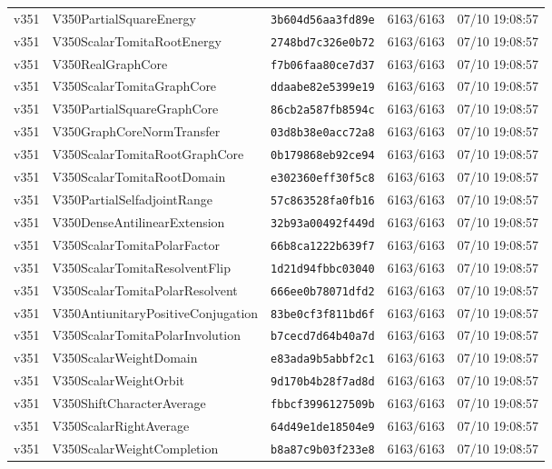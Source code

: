 \documentclass[11pt]{article}
\theoremstyle{definition}\newtheorem{deriv}{Derivation}
\begin{document}
{\begin{longtable}{@{}lllll@{}}
v351 & V350PartialSquareEnergy & \texttt{3b604d56aa3fd89e} & 6163/6163 & 07/10 19:08:57 \\
v351 & V350ScalarTomitaRootEnergy & \texttt{2748bd7c326e0b72} & 6163/6163 & 07/10 19:08:57 \\
v351 & V350RealGraphCore & \texttt{f7b06faa80ce7d37} & 6163/6163 & 07/10 19:08:57 \\
v351 & V350ScalarTomitaGraphCore & \texttt{ddaabe82e5399e19} & 6163/6163 & 07/10 19:08:57 \\
v351 & V350PartialSquareGraphCore & \texttt{86cb2a587fb8594c} & 6163/6163 & 07/10 19:08:57 \\
v351 & V350GraphCoreNormTransfer & \texttt{03d8b38e0acc72a8} & 6163/6163 & 07/10 19:08:57 \\
v351 & V350ScalarTomitaRootGraphCore & \texttt{0b179868eb92ce94} & 6163/6163 & 07/10 19:08:57 \\
v351 & V350ScalarTomitaRootDomain & \texttt{e302360eff30f5c8} & 6163/6163 & 07/10 19:08:57 \\
v351 & V350PartialSelfadjointRange & \texttt{57c863528fa0fb16} & 6163/6163 & 07/10 19:08:57 \\
v351 & V350DenseAntilinearExtension & \texttt{32b93a00492f449d} & 6163/6163 & 07/10 19:08:57 \\
v351 & V350ScalarTomitaPolarFactor & \texttt{66b8ca1222b639f7} & 6163/6163 & 07/10 19:08:57 \\
v351 & V350ScalarTomitaResolventFlip & \texttt{1d21d94fbbc03040} & 6163/6163 & 07/10 19:08:57 \\
v351 & V350ScalarTomitaPolarResolvent & \texttt{666ee0b78071dfd2} & 6163/6163 & 07/10 19:08:57 \\
v351 & V350AntiunitaryPositiveConjugation & \texttt{83be0cf3f811bd6f} & 6163/6163 & 07/10 19:08:57 \\
v351 & V350ScalarTomitaPolarInvolution & \texttt{b7cecd7d64b40a7d} & 6163/6163 & 07/10 19:08:57 \\
v351 & V350ScalarWeightDomain & \texttt{e83ada9b5abbf2c1} & 6163/6163 & 07/10 19:08:57 \\
v351 & V350ScalarWeightOrbit & \texttt{9d170b4b28f7ad8d} & 6163/6163 & 07/10 19:08:57 \\
v351 & V350ShiftCharacterAverage & \texttt{fbbcf3996127509b} & 6163/6163 & 07/10 19:08:57 \\
v351 & V350ScalarRightAverage & \texttt{64d49e1de18504e9} & 6163/6163 & 07/10 19:08:57 \\
v351 & V350ScalarWeightCompletion & \texttt{b8a87c9b03f233e8} & 6163/6163 & 07/10 19:08:57 \\

\end{longtable}}
\end{document}
